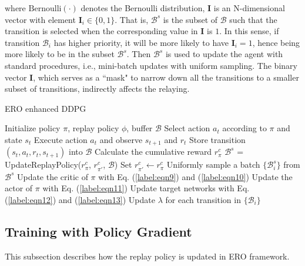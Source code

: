 \documentclass{article}
\begin{document}
where $\mathrm{Bernoulli}(\cdot)$ denotes the Bernoulli distribution, $\textbf{I}$ is an N-dimensional vector with element $\textbf{I}_i \in \{0, 1\}$. That is, $\mathcal{B}^{s}$ is the subset of $\mathcal{B}$ such that the transition is selected when the corresponding value in \textbf{I} is $1$.
In this sense, if transition $\mathcal{B}_{i}$ has higher priority, it will be more likely to have $\textbf{I}_i = 1$, hence being more likely to be in the subset $\mathcal{B}^s$. Then $\mathcal{B}^s$ is used to update the agent with standard procedures, i.e., mini-batch updates with uniform sampling. The binary vector \textbf{I}, which serves as a ``mask" to narrow down all the transitions to a smaller subset of transitions, indirectly affects the relaying.

\begin{algorithm}[t]
\caption{ERO enhanced DDPG}
\label{label:alg1}
\begin{algorithmic}[1]
\STATE Initialize policy $\pi$, replay policy $\phi$, buffer $\mathcal{B}$
        \STATE Select action $a_t$ according to $\pi$ and state $s_t$
        \STATE Execute action $a_t$ and observe $s_{t+1}$ and $r_t$
        \STATE Store transition $(s_t, a_t, r_t, s_{t+1})$ into $\mathcal{B}$
            \STATE Calculate the cumulative reward $r^{c}_{\pi}$
                \STATE $\mathcal{B}^s$ = UpdateReplayPolicy($r^{c}_{\pi}$, $r^{c}_{\pi'}$, $\mathcal{B}$)
            \ENDIF
            \STATE Set $r^{c}_{\pi'} \leftarrow r^{c}_{\pi}$
        \ENDIF
    \ENDFOR
        \STATE Uniformly sample a batch $\{\mathcal{B}^s_i\}$ from $\mathcal{B}^s$
        \STATE Update the critic of $\pi$ with Eq. (\ref{label:eqn9}) and (\ref{label:eqn10})
        \STATE Update the actor of $\pi$ with Eq. (\ref{label:eqn11})
        \STATE Update target networks with Eq. (\ref{label:eqn12}) and (\ref{label:eqn13})
        \STATE Update ${\lambda}$ for each transition in $\{\mathcal{B}_i\}$ 
    \ENDFOR
\ENDFOR
\end{algorithmic}
\end{algorithm}
\subsection{Training with Policy Gradient}
\label{label:sec3-2}
This subsection describes how the replay policy is updated in ERO framework.
\end{document}
